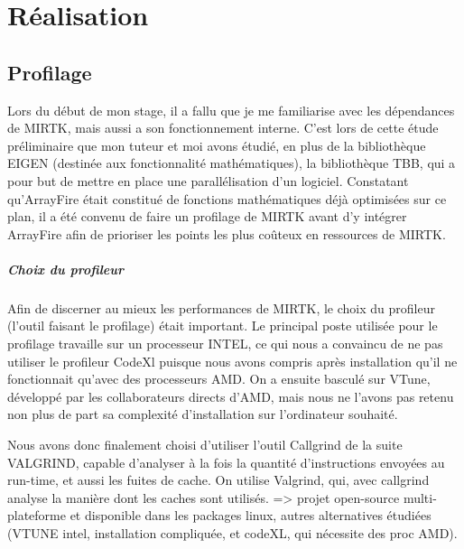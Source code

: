 \documentclass[10pt]{report}
\begin{document}
\chapter{Réalisation}
	\section{Profilage}
	Lors du début de mon stage, il a fallu que je me familiarise avec les dépendances de MIRTK, mais aussi a son fonctionnement interne. C'est lors de cette étude préliminaire que mon tuteur et moi avons étudié, en plus de la bibliothèque EIGEN (destinée aux fonctionnalité mathématiques), la bibliothèque TBB, qui a pour but de mettre en place une parallélisation d'un logiciel. Constatant qu'ArrayFire était constitué de fonctions mathématiques déjà optimisées sur ce plan, il a été convenu de faire un profilage de MIRTK avant d'y intégrer ArrayFire afin de prioriser les points les plus coûteux en ressources de MIRTK. 
	\paragraph{Choix du profileur}
	Afin de discerner au mieux les performances de MIRTK, le choix du profileur (l'outil faisant le profilage) était important. Le principal poste utilisée pour le profilage travaille sur un processeur INTEL, ce qui nous a convaincu de ne pas utiliser le profileur CodeXl puisque nous avons compris après installation qu'il ne fonctionnait qu'avec des processeurs AMD. On a ensuite basculé sur VTune, développé par les collaborateurs directs d'AMD, mais nous ne l'avons pas retenu non plus de part sa complexité d'installation sur l'ordinateur souhaité.
	
	Nous avons donc finalement choisi d'utiliser l'outil Callgrind de la suite VALGRIND, capable d'analyser à la fois la quantité d'instructions envoyées au run-time, et aussi les fuites de cache.
	On utilise Valgrind, qui, avec callgrind analyse la manière dont les caches sont utilisés.
 => projet open-source multi-plateforme et disponible dans les packages linux, autres alternatives étudiées (VTUNE intel, installation compliquée, et codeXL, qui nécessite des proc AMD).\\
	
\end{document}
